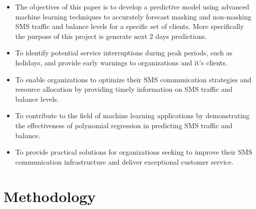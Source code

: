 \documentclass[12pt]{book} %
\begin{document}
\begin{itemize}

    \item The objectives of this paper is to develop a predictive model using advanced machine learning techniques to accurately forecast masking and non-masking SMS traffic and balance levels for a specific set of clients. More specifically the purpose of this project is generate next 2 days predictions.
    \item To identify potential service interruptions during peak periods, such as holidays, and provide early warnings to organizations and it's clients.
    \item To enable organizations to optimize their SMS communication strategies and resource allocation by providing timely information on SMS traffic and balance levels.
    \item To contribute to the field of machine learning applications by demonstrating the effectiveness of polynomial regression in predicting SMS traffic and balance.
    \item To provide practical solutions for organizations seeking to improve their SMS communication infrastructure and deliver exceptional customer service.
\end{itemize}












    

\chapter{Methodology}
\end{document}
